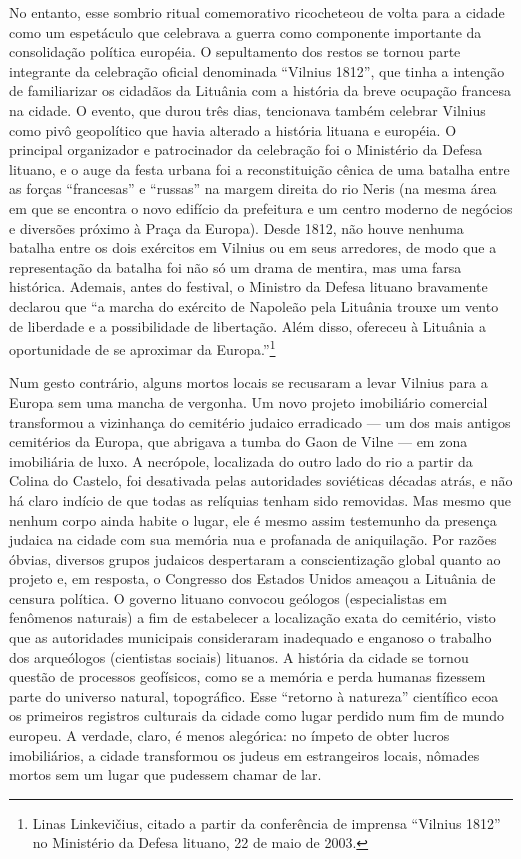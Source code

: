No entanto, esse sombrio ritual comemorativo ricocheteou de volta para a
cidade como um espetáculo que celebrava a guerra como componente
importante da consolidação política européia. O sepultamento dos restos
se tornou parte integrante da celebração oficial denominada ``Vilnius
1812'', que tinha a intenção de familiarizar os cidadãos da Lituânia com
a história da breve ocupação francesa na cidade. O evento, que durou
três dias, tencionava também celebrar Vilnius como pivô geopolítico que
havia alterado a história lituana e européia. O principal organizador e
patrocinador da celebração foi o Ministério da Defesa lituano, e o auge
da festa urbana foi a reconstituição cênica de uma batalha entre as
forças ``francesas'' e ``russas'' na margem direita do rio Neris (na
mesma área em que se encontra o novo edifício da prefeitura e um centro
moderno de negócios e diversões próximo à Praça da Europa). Desde 1812,
não houve nenhuma batalha entre os dois exércitos em Vilnius ou em seus
arredores, de modo que a representação da batalha foi não só um drama de
mentira, mas uma farsa histórica. Ademais, antes do festival, o Ministro
da Defesa lituano bravamente declarou que ``a marcha do exército de
Napoleão pela Lituânia trouxe um vento de liberdade e a possibilidade de
libertação. Além disso, ofereceu à Lituânia a oportunidade de se
aproximar da Europa.''\footnote{Linas Linkevičius, citado a partir da
  conferência de imprensa ``Vilnius 1812'' no Ministério da Defesa
  lituano, 22 de maio de 2003.}

Num gesto contrário, alguns mortos locais se recusaram a levar Vilnius
para a Europa sem uma mancha de vergonha. Um novo projeto imobiliário
comercial transformou a vizinhança do cemitério judaico erradicado --- um
dos mais antigos cemitérios da Europa, que abrigava a tumba do Gaon de
Vilne --- em zona imobiliária de luxo. A necrópole, localizada do outro
lado do rio a partir da Colina do Castelo, foi desativada pelas
autoridades soviéticas décadas atrás, e não há claro indício de que
todas as relíquias tenham sido removidas. Mas mesmo que nenhum corpo
ainda habite o lugar, ele é mesmo assim testemunho da presença judaica
na cidade com sua memória nua e profanada de aniquilação. Por razões
óbvias, diversos grupos judaicos despertaram a conscientização global
quanto ao projeto e, em resposta, o Congresso dos Estados Unidos ameaçou
a Lituânia de censura política. O governo lituano convocou geólogos
(especialistas em fenômenos naturais) a fim de estabelecer a localização
exata do cemitério, visto que as autoridades municipais consideraram
inadequado e enganoso o trabalho dos arqueólogos (cientistas sociais)
lituanos. A história da cidade se tornou questão de processos
geofísicos, como se a memória e perda humanas fizessem parte do universo
natural, topográfico. Esse ``retorno à natureza'' científico ecoa os
primeiros registros culturais da cidade como lugar perdido num fim de
mundo europeu. A verdade, claro, é menos alegórica: no ímpeto de obter
lucros imobiliários, a cidade transformou os judeus em estrangeiros
locais, nômades mortos sem um lugar que pudessem chamar de lar.

